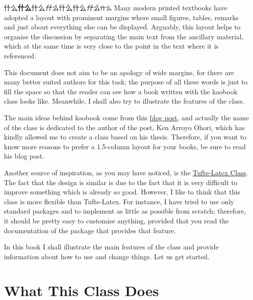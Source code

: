 什么\textbf{什么}\textsf{什么}\textit{什么}\textrm{什么}\textsc{什么}\textsl{什么}\texttt{什么}\easy
Many modern printed textbooks have adopted a layout with prominent 
margins where small figures, tables, remarks and just about everything 
else can be displayed. Arguably, this layout helps to organise the 
	discussion by separating the main text from the ancillary material, 
	which at the same time is very close to the point in the text where 
	it is referenced.

This document does not aim to be an apology of wide margins, for there 
are many better suited authors for this task; the purpose of all these 
words is just to fill the space so that the reader can see how a book 
written with the kaobook class looks like. Meanwhile, I shall also try 
to illustrate the features of the class.

The main ideas behind kaobook come from this 
\href{https://3d.bk.tudelft.nl/ken/en/2016/04/17/a-1.5-column-layout-in-latex.html}{blog 
	post}, and actually the name of the class is dedicated to the author 
of the post, Ken Arroyo Ohori, which has kindly allowed me to create a 
class based on his thesis. Therefore, if you want to know more reasons 
to prefer a 1.5-column layout for your books, be sure to read his blog 
post.

Another source of inspiration, as you may have noticed, is the 
\href{https://github.com/Tufte-LaTeX/tufte-latex}{Tufte-Latex Class}. 
The fact that the design is similar is due to the fact that it is very 
difficult to improve something which is already so good. However, I like 
to think that this class is more flexible than Tufte-Latex. For 
instance, I have tried to use only standard packages and to implement as 
little as possible from scratch; therefore, it should be pretty easy 
to customise anything, provided that you read the documentation of the 
package that provides that feature.

In this book I shall illustrate the main features of the class and 
provide information about how to use and change things. Let us get 
started.

\section{What This Class Does}

